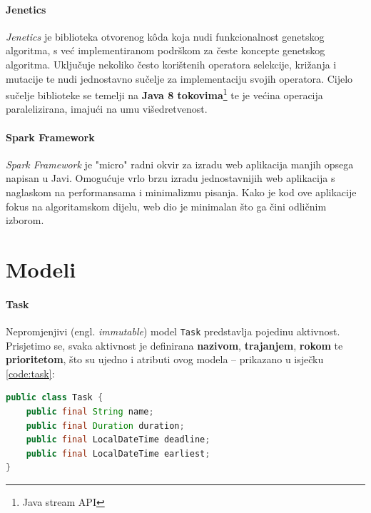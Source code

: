 \documentclass[times, utf8, zavrsni]{fer}
\begin{document}
\paragraph{Jenetics} \textit{Jenetics} je biblioteka otvorenog k{\^o}da koja nudi funkcionalnost genetskog algoritma, s već implementiranom podrškom za česte koncepte genetskog algoritma. Uključuje nekoliko često korištenih operatora selekcije, križanja i mutacije te nudi jednostavno sučelje za implementaciju svojih operatora. Cijelo sučelje biblioteke se temelji na \textbf{Java 8 tokovima}\footnote{Java stream API} te je većina operacija paralelizirana, imajući na umu višedretvenost.

\paragraph{Spark Framework} \textit{Spark Framework} je "micro" radni okvir za izradu web aplikacija manjih opsega napisan u Javi. Omogućuje vrlo brzu izradu jednostavnijih web aplikacija s naglaskom na performansama i minimalizmu pisanja. Kako je kod ove aplikacije fokus na algoritamskom dijelu, web dio je minimalan što ga čini odličnim izborom.

\section{Modeli}
\paragraph{Task} Nepromjenjivi (engl. \textit{immutable}) model \texttt{Task} predstavlja pojedinu aktivnost. Prisjetimo se, svaka aktivnost je definirana \textbf{nazivom}, \textbf{trajanjem}, \textbf{rokom} te \textbf{prioritetom}, što su ujedno i atributi ovog modela -- prikazano u isječku \ref{code:task}:
\begin{lstlisting}[language=java, caption=Razred Task, label={code:task}]
public class Task {
	public final String name;
	public final Duration duration;
	public final LocalDateTime deadline;
	public final LocalDateTime earliest;
}
\end{lstlisting}
\end{document}
